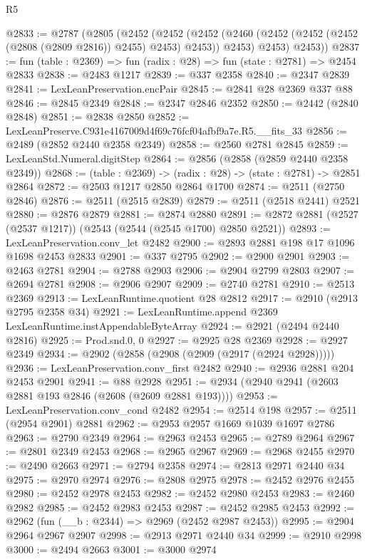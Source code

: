 \begin{lexlean}{R5}
\begin{coremodule}
@2833 := @2787
    (@2805
      (@2452
        (@2452
          (@2452 (@2460 (@2452 (@2452 (@2452 (@2808 (@2809 @2816)) @2455) @2453) @2453)) @2453)
          @2453)
        @2453))
@2837 := fun (table : @2369) => fun (radix : @28) => fun (state : @2781) => @2454 @2833
@2838 := @2483 @1217
@2839 := @337 @2358
@2840 := @2347 @2839
@2841 := LexLeanPreservation.encPair
@2845 := @2841 @28 @2369 @337 @88
@2846 := @2845 @2349
@2848 := @2347 @2846 @2352
@2850 := @2442 (@2840 @2848)
@2851 := @2838 @2850
@2852 := LexLeanPreserve.C931e4167009d4f69c76fcf04afbf9a7e.R5.__fits_33
@2856 := @2489 (@2852 @2440 @2358 @2349)
@2858 := @2560 @2781 @2845
@2859 := LexLeanStd.Numeral.digitStep
@2864 := @2856 (@2858 (@2859 @2440 @2358 @2349))
@2868 := (table : @2369) -> (radix : @28) -> (state : @2781) -> @2851 @2864
@2872 := @2503 @1217 @2850 @2864 @1700
@2874 := @2511 (@2750 @2846)
@2876 := @2511 (@2515 @2839)
@2879 := @2511 (@2518 @2441) @2521
@2880 := @2876 @2879
@2881 := @2874 @2880
@2891 := @2872 @2881 (@2527 (@2537 @1217)) (@2543 (@2544 (@2545 @1700) @2850 @2521))
@2893 := LexLeanPreservation.conv_let @2482
@2900 := @2893 @2881 @198 @17 @1096 @1698 @2453 @2833
@2901 := @337 @2795
@2902 := @2900 @2901
@2903 := @2463 @2781
@2904 := @2788 @2903
@2906 := @2904 @2799 @2803
@2907 := @2694 @2781
@2908 := @2906 @2907
@2909 := @2740 @2781
@2910 := @2513 @2369
@2913 := LexLeanRuntime.quotient @28 @2812
@2917 := @2910 (@2913 @2795 @2358 @34)
@2921 := LexLeanRuntime.append @2369 LexLeanRuntime.instAppendableByteArray
@2924 := @2921 (@2494 @2440 @2816)
@2925 := Prod.snd.{0, 0}
@2927 := @2925 @28 @2369
@2928 := @2927 @2349
@2934 := @2902 (@2858 (@2908 (@2909 (@2917 (@2924 @2928)))))
@2936 := LexLeanPreservation.conv_first @2482
@2940 := @2936 @2881 @204 @2453 @2901
@2941 := @88 @2928
@2951 := @2934 (@2940 @2941 (@2603 @2881 @193 @2846 (@2608 (@2609 @2881 @193))))
@2953 := LexLeanPreservation.conv_cond @2482
@2954 := @2514 @198
@2957 := @2511 (@2954 @2901) @2881
@2962 := @2953 @2957 @1669 @1039 @1697 @2786
@2963 := @2790 @2349
@2964 := @2963 @2453
@2965 := @2789 @2964
@2967 := @2801 @2349 @2453
@2968 := @2965 @2967
@2969 := @2968 @2455
@2970 := @2490 @2663
@2971 := @2794 @2358
@2974 := @2813 @2971 @2440 @34
@2975 := @2970 @2974
@2976 := @2808 @2975
@2978 := @2452 @2976 @2455
@2980 := @2452 @2978 @2453
@2982 := @2452 @2980 @2453
@2983 := @2460 @2982
@2985 := @2452 @2983 @2453
@2987 := @2452 @2985 @2453
@2992 := @2962 (fun (__b : @2344) => @2969 (@2452 @2987 @2453))
@2995 := @2904 @2964 @2967 @2907
@2998 := @2913 @2971 @2440 @34
@2999 := @2910 @2998
@3000 := @2494 @2663
@3001 := @3000 @2974

\end{coremodule}
\end{lexlean}
